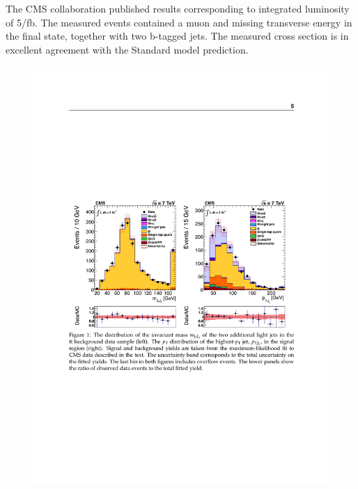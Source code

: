 	
The CMS collaboration published results corresponding to integrated luminosity of 5/fb. The measured events contained a muon and missing transverse energy in the final state, together with two b-tagged jets. The measured cross section is in excellent agreement with the Standard model prediction.\citep{Chatrchyan:2013uza}

\begin{figure}[htbp]
	\centering
		\includegraphics{Figures/cms_tot.pdf}
	\caption[CMS Wbb total cross section measurement]{\citep{Chatrchyan:2013uza} }
	\label{fig:cms_total}
\end{figure}